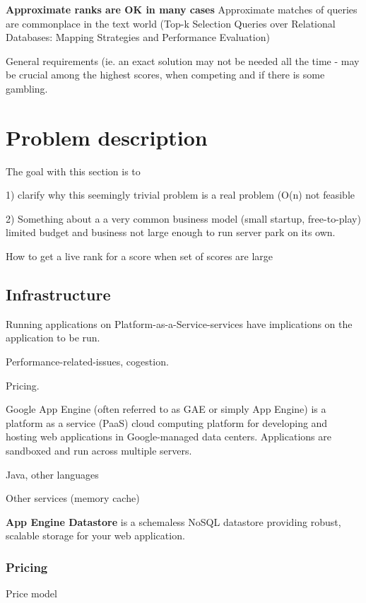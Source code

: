 \textbf{Approximate ranks are OK in many cases} Approximate matches of queries are commonplace in the text world (Top-k Selection Queries over Relational
Databases: Mapping Strategies and
Performance Evaluation)

General requirements (ie. an exact solution may not be needed all the time - may be crucial among the highest scores, when competing and if there is some gambling.
  
\section{Problem description}

\begin{shaded}The goal with this section is to

  1) clarify why this seemingly trivial problem is a real problem (O(n) \ra not feasible

  2) Something about a a very common business model (small startup, free-to-play) limited budget and business not large enough to run server park on its own. \end{shaded}

How to get a live rank for a score when set of scores are large

\subsection{Infrastructure}

\begin{shaded}
  Running applications on Platform-as-a-Service-services have implications on the application to be run.

  Performance-related-issues, cogestion.

  Pricing.

  \end{shaded}

Google App Engine (often referred to as GAE or simply App Engine) is a platform as a service (PaaS) cloud computing platform for developing and hosting web applications in Google-managed data centers. Applications are sandboxed and run across multiple servers.

Java, other languages
 
Other services (memory cache)

\textbf{App Engine Datastore} is a schemaless NoSQL datastore providing robust, scalable storage for your web application.

\subsubsection{Pricing}

Price model
